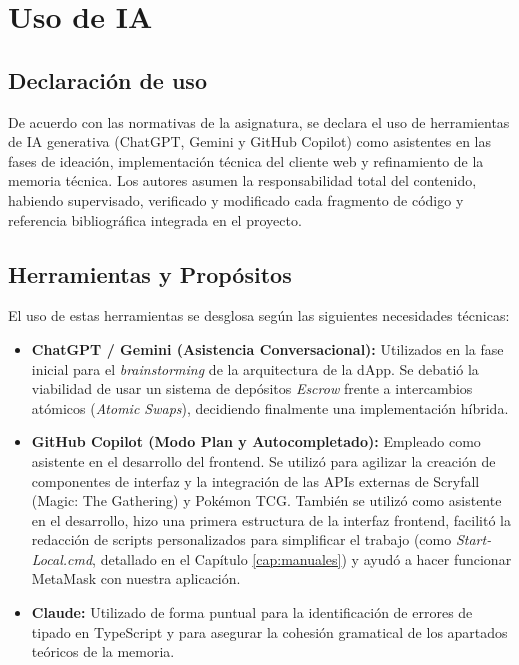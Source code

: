 \chapter{Uso de IA}\label{cap:ia}

\section{Declaración de uso}
De acuerdo con las normativas de la asignatura, se declara el uso de herramientas de IA generativa (ChatGPT, Gemini y GitHub Copilot) como asistentes en las fases de ideación, implementación técnica del cliente web y refinamiento de la memoria técnica. Los autores asumen la responsabilidad total del contenido, habiendo supervisado, verificado y modificado cada fragmento de código y referencia bibliográfica integrada en el proyecto.

\section{Herramientas y Propósitos}
El uso de estas herramientas se desglosa según las siguientes necesidades técnicas:

\begin{itemize}
	\item \textbf{ChatGPT / Gemini (Asistencia Conversacional):} Utilizados en la fase inicial para el \textit{brainstorming} de la arquitectura de la dApp. Se debatió la viabilidad de usar un sistema de depósitos \textit{Escrow} frente a intercambios atómicos (\textit{Atomic Swaps}), decidiendo finalmente una implementación híbrida.
	\item \textbf{GitHub Copilot (Modo Plan y Autocompletado):} Empleado como asistente en el desarrollo del frontend. 
	Se utilizó para agilizar la creación de componentes de interfaz y la integración de las APIs externas de Scryfall 
	(Magic: The Gathering) y Pokémon TCG. También se utilizó como asistente en el desarrollo, hizo una primera estructura 
	de la interfaz frontend, facilitó la redacción de scripts personalizados para simplificar el trabajo (como \textit{Start-Local.cmd}, 
	detallado en el Capítulo \ref{cap:manuales}) y ayudó a hacer funcionar MetaMask con nuestra aplicación. 
	\item \textbf{Claude:} Utilizado de forma puntual para la identificación de errores de tipado en TypeScript y para asegurar 
	la cohesión gramatical de los apartados teóricos de la memoria.
\end{itemize}

